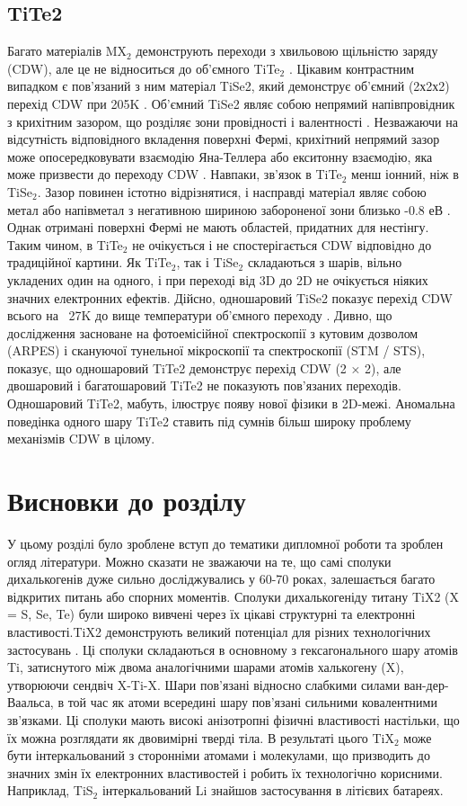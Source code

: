 \subsection{TiTe2}
Багато матеріалів MX$_2$ демонструють переходи з хвильовою щільністю заряду (CDW), але це не відноситься до об'ємного TiTe$_2$ \cite{PhysRevB29,TiTe2_2, TiTe2_3, TiTe2_4}. Цікавим контрастним випадком є пов'язаний з ним матеріал TiSe2, який демонструє об'ємний (2х2х2) перехід CDW при 205K \cite{TiTe2_5}. Об'ємний TiSe2 являє собою непрямий напівпровідник з крихітним зазором, що розділяє зони провідності і валентності \cite{TiTe2_6}. Незважаючи на відсутність відповідного вкладення поверхні Фермі, крихітний непрямий зазор може опосередковувати взаємодію Яна-Теллера або екситонну взаємодію, яка може призвести до переходу CDW \cite{TiTe2_6}. Навпаки, зв'язок в TiTe$_2$ менш іонний, ніж в TiSe$_2$. Зазор повинен істотно відрізнятися, і насправді матеріал являє собою метал або напівметал з негативною шириною забороненої зони близько -0.8 $еВ$ \cite{PhysRevB.54.2453}. Однак отримані поверхні Фермі не мають областей, придатних для нестінгу. Таким чином, в TiTe$_2$ не очікується і не спостерігається CDW відповідно до традиційної картини. Як TiTe$_2$, так і TiSe$_2$ складаються з шарів, вільно укладених один на одного, і при переході від 3D до 2D не очікується ніяких значних електронних ефектів. Дійсно, одношаровий TiSe2 показує перехід CDW всього на ~27K до вище температури об'ємного переходу \cite{TiTe2_7}.
Дивно, що дослідження засноване на фотоемісійної спектроскопії з кутовим дозволом (ARPES) і скануючої тунельної мікроскопії та спектроскопії (STM / STS), показує, що одношаровий TiTe2 демонструє перехід CDW (2 × 2), але двошаровий і багатошаровий TiTe2 не показують пов'язаних переходів. Одношаровий TiTe2, мабуть, ілюструє появу нової фізики в 2D-межі. Аномальна поведінка одного шару TiTe2 ставить під сумнів більш широку проблему механізмів CDW в цілому.
\section{Висновки до розділу} 
У цьому розділі було зроблене вступ до тематики дипломної роботи та зроблен огляд літератури. Можно сказати не зважаючи на те, що самі сполуки дихалькогенів дуже сильно досліджувались у 60-70 роках, залешається багато відкритих питань або спорних моментів. 
Сполуки дихалькогеніду титану TiX2 (X = S, Se, Te) були широко вивчені через їх цікаві структурні та електронні властивості.TiX2 демонструють великий потенціал для різних технологічних застосувань \cite{Yoffe}. Ці сполуки складаються в основному з гексагонального шару атомів Ti, затиснутого між двома аналогічними шарами атомів халькогену (X), утворюючи  сендвіч X-Ti-X. Шари пов'язані відносно слабкими силами ван-дер-Ваальса, в той час як атоми всередині шару пов'язані сильними ковалентними зв'язками. Ці сполуки мають високі анізотропні фізичні властивості настільки, що їх можна розглядати як двовимірні тверді тіла. В результаті цього TiX$_2$ може бути інтеркальований з сторонніми атомами і молекулами, що призводить до значних змін їх електронних властивостей і робить їх технологічно корисними. Наприклад, TiS$_2$ інтеркальований Li знайшов застосування в літієвих батареях.

